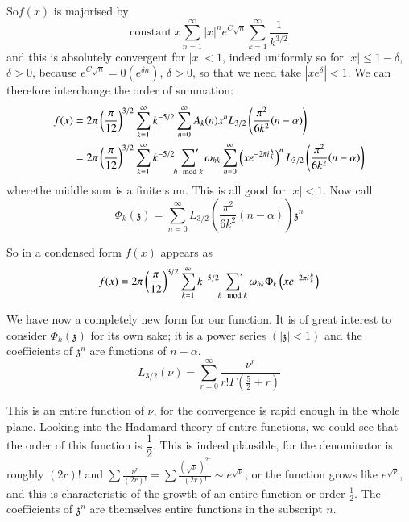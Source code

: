 So\pageoriginale $f(x)$ is majorised by
$$
\text{constant} ~x \sum^\infty_{n=1} |x|^n e^{C\sqrt{n}}
\sum^\infty_{k=1} \frac{1}{k^{3/2}}
$$
and this is absolutely convergent for $|x|< 1$, indeed uniformly so
for $|x|\leq 1- \delta$, $\delta > 0$, because $e^{C \sqrt{n}}=
0(e^{\delta n})$, $\delta > 0$, so that we need take $|x e^\delta|
<1$. We can therefore interchange the order of summation:
\begin{align*}
  f(x) & = 2\pi \left( \frac{\pi}{12} \right)^{3/2} \sum^\infty_{k=1}
  k^{- 5/2} \sum^\infty_{n=0} A_k (n) x^n L_{3/2} \left(
  \frac{\pi^2}{6k^2} (n- \alpha)\right)\\
  & = 2 \pi \left(\frac{\pi}{12} \right)^{3/2} \sum^\infty_{k=1} k^{-
    5/2} \sideset{}{'}\sum_{h \mod k} \omega_{hk} \sum^\infty_{n=0} \left(xe^{- 2
    \pi i \frac{h}{k}} \right)^n L_{3/2} \left( \frac{\pi^2}{6k^2} (n-
  \alpha)\right)
\end{align*}
where\pageoriginale the middle sum is a finite sum. This is all good
for $|x|<1$. Now call
$$
\Phi_k (\mathfrak{z})= \sum^\infty_{n=0} L_{3/2} \left(
\frac{\pi^2}{6k^2} (n- \alpha)\right) \mathfrak{z}^n
$$

So in a condensed form $f(x)$ appears as
$$
f(x) = 2 \pi \left( \frac{\pi}{12}\right)^{3/2} \sum^\infty_{k=1}
k^{-5/2} \sideset{}{'}\sum_{h \mod k} \omega_{hk} \Phi_k \left(x e^{- 2\pi i
    \frac{h}{k}}\right) 
$$

We have now a completely new form for our function. It is of great
interest to consider $\Phi_k (\mathfrak{z})$ for its own sake; it is a
power series $(|\mathfrak{z}|<1)$ and the coefficients of
$\mathfrak{z}^n$ are functions of $n-\alpha$. 
$$
L_{3/2} (\nu) = \sum^\infty_{r=0} \frac{\nu^r}{r! \Gamma \left(
  \frac{5}{2} +r\right)}
$$

This is an entire function of $\nu$, for the convergence is rapid
enough in the whole plane. Looking into the Hadamard theory of entire
functions, we could see that the order of this function is
$\dfrac{1}{2}$. This is indeed plausible, for the denominator is
roughly $(2r)!$ and $\sum \frac{\nu^r}{(2 r)!}= \sum
\frac{(\sqrt{\nu})^{2r}}{(2r)!} \sim e^{\sqrt{\nu}}$; or the function
grows like $e^{\sqrt{\nu}}$, and this is characteristic of the growth
of an entire function or order $\frac{1}{2}$. The coefficients of
$\mathfrak{z}^n$ are themselves entire functions in the subscript
$n$. 


